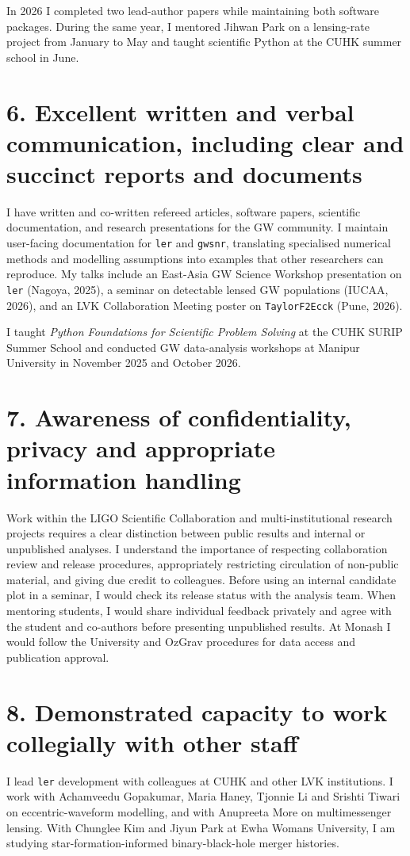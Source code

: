 \documentclass[11pt]{article}
\begin{document}
In 2026 I completed two lead-author papers while maintaining both software packages. During the same year, I mentored Jihwan Park on a lensing-rate project from January to May and taught scientific Python at the CUHK summer school in June.

\section*{6. Excellent written and verbal communication, including clear and succinct reports and documents}
I have written and co-written refereed articles, software papers, scientific documentation, and research presentations for the GW community. I maintain user-facing documentation for \texttt{ler} and \texttt{gwsnr}, translating specialised numerical methods and modelling assumptions into examples that other researchers can reproduce. My talks include an East-Asia GW Science Workshop presentation on \texttt{ler} (Nagoya, 2025), a seminar on detectable lensed GW populations (IUCAA, 2026), and an LVK Collaboration Meeting poster on \texttt{TaylorF2Ecck} (Pune, 2026).

I taught \emph{Python Foundations for Scientific Problem Solving} at the CUHK SURIP Summer School and conducted GW data-analysis workshops at Manipur University in November 2025 and October 2026.

\section*{7. Awareness of confidentiality, privacy and appropriate information handling}
Work within the LIGO Scientific Collaboration and multi-institutional research projects requires a clear distinction between public results and internal or unpublished analyses. I understand the importance of respecting collaboration review and release procedures, appropriately restricting circulation of non-public material, and giving due credit to colleagues. Before using an internal candidate plot in a seminar, I would check its release status with the analysis team. When mentoring students, I would share individual feedback privately and agree with the student and co-authors before presenting unpublished results. At Monash I would follow the University and OzGrav procedures for data access and publication approval.

\section*{8. Demonstrated capacity to work collegially with other staff}
I lead \texttt{ler} development with colleagues at CUHK and other LVK institutions. I work with Achamveedu Gopakumar, Maria Haney, Tjonnie Li and Srishti Tiwari on eccentric-waveform modelling, and with Anupreeta More on multimessenger lensing. With Chunglee Kim and Jiyun Park at Ewha Womans University, I am studying star-formation-informed binary-black-hole merger histories.
\end{document}
